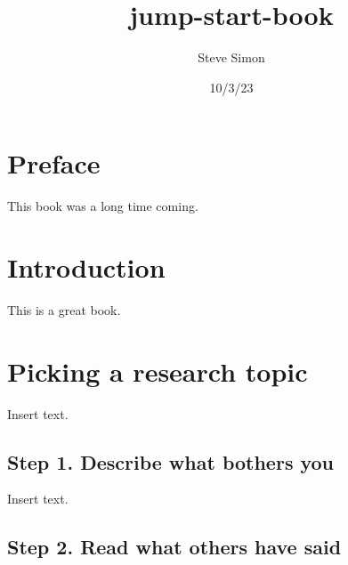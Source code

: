 \documentclass[
  letterpaper,
  DIV=11,
  numbers=noendperiod]{scrreprt}
\title{jump-start-book}
\author{Steve Simon}
\date{10/3/23}
\renewcommand*\contentsname{Table of contents}
\newcommand\contentsname{Table of contents}
\begin{document}
\maketitle
\ifdefined\Shaded\renewenvironment{Shaded}{\begin{tcolorbox}[interior hidden, breakable, frame hidden, enhanced, borderline west={3pt}{0pt}{shadecolor}, boxrule=0pt, sharp corners]}{\end{tcolorbox}}\fi

\renewcommand*\contentsname{Table of contents}
{
\hypersetup{linkcolor=}
\setcounter{tocdepth}{2}
\tableofcontents
}

\hypertarget{preface}{%
\chapter*{Preface}\label{preface}}


This book was a long time coming.


\hypertarget{introduction}{%
\chapter{Introduction}\label{introduction}}

This is a great book.


\hypertarget{picking-a-research-topic}{%
\chapter{Picking a research topic}\label{picking-a-research-topic}}

Insert text.

\hypertarget{step-1.-describe-what-bothers-you}{%
\section{Step 1. Describe what bothers
you}\label{step-1.-describe-what-bothers-you}}

Insert text.

\hypertarget{step-2.-read-what-others-have-said}{%
\section{Step 2. Read what others have
said}\label{step-2.-read-what-others-have-said}}
\end{document}
